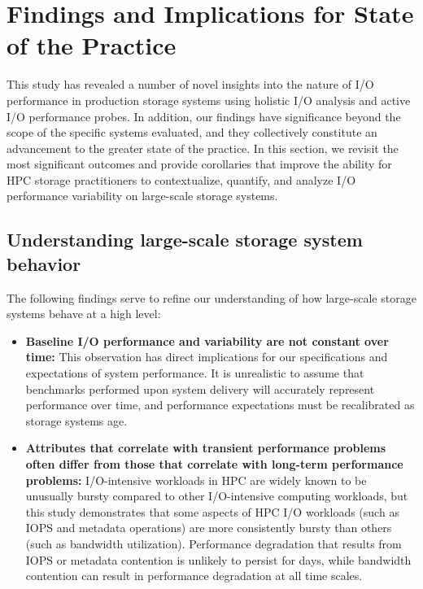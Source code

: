 \section{Findings and Implications for State of the Practice}
\label{sec:findings}

This study has revealed a number of novel insights into the nature of I/O performance in production storage systems using holistic I/O analysis and active I/O performance probes.
In addition, our findings have significance beyond the scope of the specific systems evaluated, and they collectively constitute an advancement to the greater state of the practice.
In this section, we revisit the most significant outcomes and provide corollaries that improve the ability for HPC storage practitioners to contextualize, quantify, and analyze I/O performance variability on large-scale storage systems.

\subsection{Understanding large-scale storage system behavior}

The following findings serve to refine our understanding of how large-scale storage
systems behave at a high level: 

\begin{itemize}[leftmargin=*]

\item \textbf{Baseline I/O performance and variability are not constant over
time:}
This observation has direct implications for our specifications and expectations of system performance.
It is unrealistic to assume that benchmarks performed upon system delivery will accurately represent performance over time, and performance expectations must be recalibrated as storage systems age.

\item \textbf{Attributes that correlate with transient performance problems often differ from those that correlate with long-term performance problems:}
I/O-intensive workloads in HPC are widely known to be unusually bursty compared to other I/O-intensive computing workloads, but this study demonstrates that some aspects of HPC I/O workloads (such as IOPS and metadata operations) are more consistently bursty than others (such as bandwidth utilization).
Performance degradation that results from IOPS or metadata contention is unlikely to persist for days, while bandwidth contention can result in performance degradation at all time scales.

\end{itemize}


